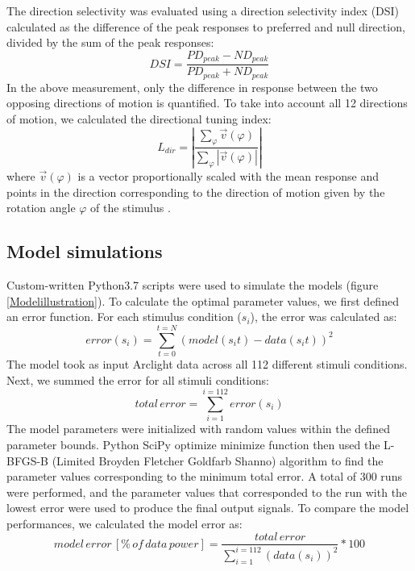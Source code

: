 \documentclass[9pt,lineno]{elife}
\begin{document}
The direction selectivity was evaluated using a direction selectivity index (DSI) calculated as the difference of the peak responses to preferred and null direction, divided by the sum of the peak responses:
\begin{equation}
DSI = \frac{PD_{peak} - ND_{peak}}{PD_{peak} + ND_{peak}}
\label{DSIequation}
\end{equation}
In the above measurement, only the difference in response between the two opposing directions of motion is quantified. To take into account all 12 directions of motion, we calculated the directional tuning index:
\begin{equation}
L_{dir} = \left|\frac{\sum_{\varphi}^{}{\vec{v}(\varphi)}}{\sum_{\varphi}^{}{|\vec{v}(\varphi)|}}\right|
\label{Ldirequation}
\end{equation}
where $\vec{v}(\varphi)$ is a vector proportionally scaled with the mean response and points in the direction corresponding to the direction of motion given by the rotation angle $\varphi$ of the stimulus \parencite{Mazurek2014}.

\subsection{Model simulations}
Custom-written Python3.7 scripts were used to simulate the models (figure \ref{Modelillustration}). To calculate the optimal parameter values, we first defined an error function. For each stimulus condition ($s_{i}$), the error was calculated as: 
\begin{equation}
error(s_{i}) = \sum_{t=0}^{t=N} (model (s_{i}t) - data (s_{i}t))^2
\label{error}
\end{equation}
The model took as input Arclight data across all 112 different stimuli conditions. Next, we summed the error for all stimuli conditions: 
\begin{equation}
total\, error = \sum_{i=1}^{i=112} error(s_{i})
\label{totalerror}
\end{equation}
The model parameters were initialized with random values within the defined parameter bounds. Python SciPy optimize minimize function then used the L-BFGS-B (Limited Broyden Fletcher Goldfarb Shanno) algorithm to find the parameter values corresponding to the minimum total error. A total of 300 runs were performed, and the parameter values that corresponded to the run with the lowest error were used to produce the final output signals. To compare the model performances, we calculated the model error as: 
\begin{equation}
model \, error \, [\% \, of \, data \, power] = \frac{total \, error}{\sum_{i=1}^{i=112}(data(s_{i}))^2}  * 100
\label{modelerror}
\end{equation}
\end{document}

